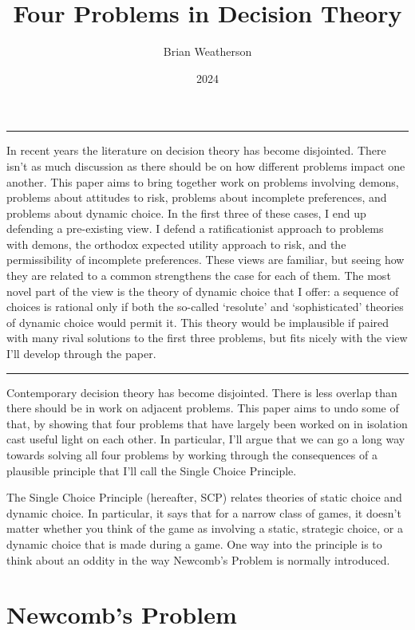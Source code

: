 \documentclass[
  10pt,
  letterpaper,
  DIV=11,
  numbers=noendperiod,
  twoside]{scrartcl}
\title{Four Problems in Decision Theory}
\author{Brian Weatherson}
\date{2024}
\renewenvironment{abstract}
 {\vspace{-1.25cm}
 \quotation\small\noindent\rule{\linewidth}{.5pt}\par\smallskip
 \noindent }
 {\par\noindent\rule{\linewidth}{.5pt}\endquotation}
\begin{document}
\maketitle
\begin{abstract}
In recent years the literature on decision theory has become disjointed.
There isn't as much discussion as there should be on how different
problems impact one another. This paper aims to bring together work on
problems involving demons, problems about attitudes to risk, problems
about incomplete preferences, and problems about dynamic choice. In the
first three of these cases, I end up defending a pre-existing view. I
defend a ratificationist approach to problems with demons, the orthodox
expected utility approach to risk, and the permissibility of incomplete
preferences. These views are familiar, but seeing how they are related
to a common strengthens the case for each of them. The most novel part
of the view is the theory of dynamic choice that I offer: a sequence of
choices is rational only if both the so-called `resolute' and
`sophisticated' theories of dynamic choice would permit it. This theory
would be implausible if paired with many rival solutions to the first
three problems, but fits nicely with the view I'll develop through the
paper.
\end{abstract}

Contemporary decision theory has become disjointed. There is less
overlap than there should be in work on adjacent problems. This paper
aims to undo some of that, by showing that four problems that have
largely been worked on in isolation cast useful light on each other. In
particular, I'll argue that we can go a long way towards solving all
four problems by working through the consequences of a plausible
principle that I'll call the Single Choice Principle.

The Single Choice Principle (hereafter, SCP) relates theories of static
choice and dynamic choice. In particular, it says that for a narrow
class of games, it doesn't matter whether you think of the game as
involving a static, strategic choice, or a dynamic choice that is made
during a game. One way into the principle is to think about an oddity in
the way Newcomb's Problem is normally introduced.

\section{Newcomb's Problem}\label{newcombs-problem}
\end{document}
